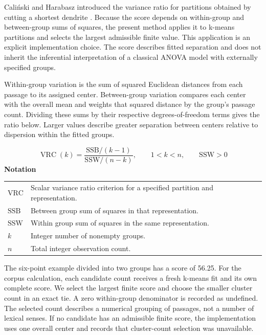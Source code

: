 \documentclass[10pt,letterpaper]{article}
\newcommand{\notlabel}{\noindent\textbf{Notation}\par\nobreak\vspace{4pt}}
\begin{document}
Caliński and Harabasz introduced the variance ratio for partitions obtained by cutting a shortest dendrite \cite{calinski}. Because the score depends on within-group and between-group sums of squares, the present method applies it to k-means partitions and selects the largest admissible finite value. This application is an explicit implementation choice. The score describes fitted separation and does not inherit the inferential interpretation of a classical ANOVA model with externally specified groups.\par

Within-group variation is the sum of squared Euclidean distances from each passage to its assigned center. Between-group variation compares each center with the overall mean and weights that squared distance by the group's passage count. Dividing these sums by their respective degrees-of-freedom terms gives the ratio below. Larger values describe greater separation between centers relative to dispersion within the fitted groups.\par

\par\noindent\begin{minipage}{\linewidth}
\begin{equation}\label{eq:vrc}
\operatorname{VRC}(k)=\frac{\mathrm{SSB}/(k-1)}{\mathrm{SSW}/(n-k)},\qquad 1<k<n,\qquad\mathrm{SSW}>0
\end{equation}
\notlabel
{\fontsize{8.5}{10.5}\selectfont\setlength{\tabcolsep}{0pt}\renewcommand{\arraystretch}{1.12}
\begin{tabularx}{\linewidth}{@{}p{.14\linewidth}X@{}}
$\mathrm{VRC}$ & Scalar variance ratio criterion for a specified partition and representation.\\
$\mathrm{SSB}$ & Between group sum of squares in that representation.\\
$\mathrm{SSW}$ & Within group sum of squares in the same representation.\\
$k$ & Integer number of nonempty groups.\\
$n$ & Total integer observation count.\\
\end{tabularx}}
\par\vspace{2pt}
\end{minipage}\par
The six-point example divided into two groups has a score of 56.25. For the corpus calculation, each candidate count receives a fresh k-means fit and its own complete score. We select the largest finite score and choose the smaller cluster count in an exact tie. A zero within-group denominator is recorded as undefined. The selected count describes a numerical grouping of passages, not a number of lexical senses. If no candidate has an admissible finite score, the implementation uses one overall center and records that cluster-count selection was unavailable.\par
\end{document}
